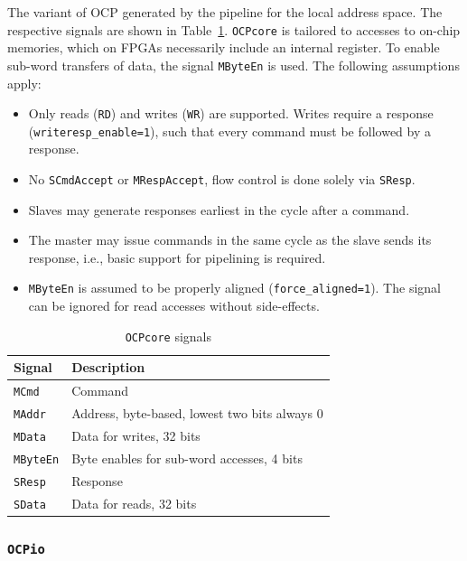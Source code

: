 \documentclass[a4paper,fontsize=10pt,twoside,DIV15,BCOR12mm,headinclude=true,footinclude=false,pagesize,bibtotoc]{scrbook}
\newcommand{\code}[1]{{\texttt{#1}}}
\begin{document}
The variant of OCP generated by the pipeline for the local address
space. The respective signals are shown in
Table~\ref{tab:coresignals}. \code{OCPcore} is tailored to accesses to
on-chip memories, which on FPGAs necessarily include an internal
register. To enable sub-word transfers of data, the signal
\code{MByteEn} is used. The following assumptions apply:
\begin{itemize}
\item Only reads (\code{RD}) and writes (\code{WR}) are
  supported. Writes require a response (\code{writeresp\_enable=1}),
  such that every command must be followed by a response.
\item No \code{SCmdAccept} or \code{MRespAccept}, flow control is done
  solely via \code{SResp}.
\item Slaves may generate responses earliest in the cycle after a
  command.
\item The master may issue commands in the same cycle as the slave
  sends its response, i.e., basic support for pipelining is required.
\item \code{MByteEn} is assumed to be properly aligned
  (\code{force\_aligned=1}). The signal can be ignored for read
  accesses without side-effects.
\end{itemize}

\begin{table}
  \centering
  \caption{\code{OCPcore} signals}
  \label{tab:coresignals}
  \begin{tabular}{ll}
    \toprule
    Signal & Description \\
    \midrule
    \code{MCmd} & Command \\
    \code{MAddr} & Address, byte-based, lowest two bits always 0 \\
    \code{MData} & Data for writes, 32 bits \\
    \code{MByteEn} & Byte enables for sub-word accesses, 4 bits \\
    \cmidrule{1-2}
    \code{SResp} & Response \\
    \code{SData} & Data for reads, 32 bits \\
    \bottomrule
  \end{tabular}
\end{table}

\subsubsection{\code{OCPio}}
\end{document}
